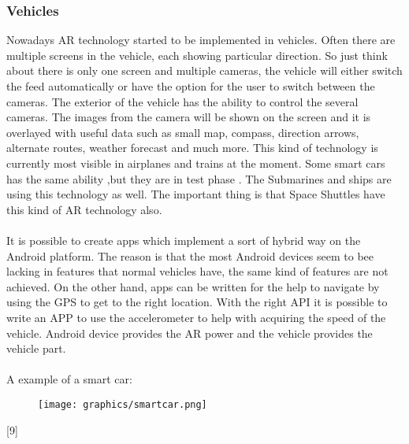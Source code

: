  \subsubsection{Vehicles}
 Nowadays AR technology started to be implemented in vehicles. Often there are multiple screens in the vehicle, each showing particular direction. So just think about there is only one screen and multiple cameras, the vehicle will either switch the feed automatically or have the option for the user to switch  between the cameras. The exterior of the vehicle has the ability to control the several cameras. The images from the camera will be shown on the screen and it is overlayed with useful data such as small map, compass, direction arrows, alternate routes, weather forecast and much more. This kind of technology is currently most visible in airplanes and trains at the moment. Some smart cars has the same ability ,but they are in test phase . The Submarines and ships are using this technology as well. The important thing is that Space Shuttles have this kind of AR technology also.
 \\
 \\
 It is possible to create apps which implement a sort of hybrid way on the Android platform. The reason is that the most Android devices seem to bee lacking in features that normal vehicles have, the same kind of features are not achieved. On the other hand, apps can be written for the help to navigate by using the GPS to get to the right location.  With the right API it is possible to write an APP to use the accelerometer to help with  acquiring the speed of the vehicle. Android device provides the AR power and the vehicle  provides the vehicle part.\cite{AugmentedBook}
 \\
 \\
 A example of a smart car:
 \begin{figure}[htbp]
 \centering
 \texttt{[image: graphics/smartcar.png]}
 \caption{\cite{smartcar}}
 \end{figure}
 [9]
